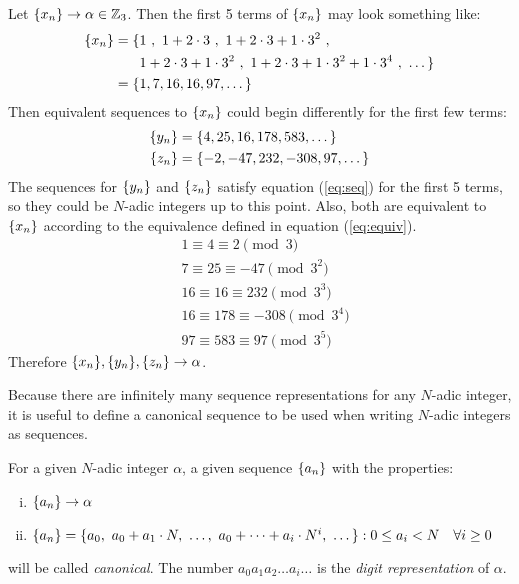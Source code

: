 \begin{example} \label{ex:equiv-seq}
  Let $\{x_n\} \rightarrow \alpha \in \mathbb{Z}_3$. Then the first 5 terms of
  $\{x_n\}$ may look something like:
  \begin{align*}
    \xn = \{&1 \ , \ 1+2\cdot3 \ , \ 1+2\cdot3+1\cdot3^2 \ , \\
    &1+2\cdot3+1\cdot3^2 \ , \ 1+2\cdot3+1\cdot3^2+1\cdot3^4 \ , \ \dots\} \\
        = \{&1,7,16,16,97,\dots\}
  \end{align*}
  Then equivalent sequences to $\{x_n\}$ could begin differently for the
  first few terms:
  \begin{align*}
    \{y_n\} &= \{4,25,16,178,583,\dots\} \\
    \{z_n\} &= \{-2,-47,232,-308,97,\dots\}
  \end{align*}
  The sequences for $\{y_n\}$ and $\{z_n\}$ satisfy equation (\ref{eq:seq})
  for the first 5 terms, so they could be $N$-adic integers up to this
  point. Also, both are equivalent to $\{x_n\}$ according to the
  equivalence defined in equation (\ref{eq:equiv}).
  \begin{align*}
    &1 \equiv 4 \equiv 2 \pmod 3 \\
    &7 \equiv 25 \equiv -47 \pmod{3^2} \\
    &16 \equiv 16 \equiv 232 \pmod{3^3} \\
    &16 \equiv 178 \equiv -308 \pmod{3^4} \\
    &97 \equiv 583 \equiv 97 \pmod{3^5}
  \end{align*}
  Therefore $\{x_n\},\{y_n\},\{z_n\} \rightarrow \alpha$.
\end{example}

\par Because there are infinitely many sequence representations for any $N$-adic
integer, it is useful to define a canonical sequence to be used when
writing $N$-adic integers as sequences.
  
\begin{definition}
\label{def:canon}
  For a given $N$-adic integer $\alpha$, a given sequence $\{a_n\}$ with
  the properties:
  \begin{enumerate}[i.]
    \item $\{a_n\} \rightarrow \alpha$
    \item $\{a_n\}=\{a_0, \ a_0+a_1\cdot N, \ \dots, \ a_0+\dots+a_i\cdot N^i, \ \dots\} : 0 \leq a_i < N \ \ \ \forall i \geq 0$
  \end{enumerate}
  will be called {\em canonical}. The number $a_0a_1a_2 \dots a_i \dots$
  is the {\em digit representation} of $\alpha$.
\end{definition}


